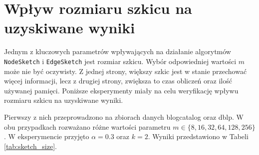 \section{Wpływ rozmiaru szkicu na uzyskiwane wyniki}
    Jednym z kluczowych parametrów wpływających na działanie algorytmów \texttt{NodeSketch} i \texttt{EdgeSketch} jest rozmiar szkicu. Wybór odpowiedniej wartości $m$ może nie być oczywisty. Z jednej strony, większy szkic jest w stanie przechować więcej informacji, lecz z drugiej strony, zwiększa to czas obliczeń oraz ilość używanej pamięci. Poniższe eksperymenty miały na celu weryfikację wpływu rozmiaru szkicu na uzyskiwane wyniki.

    Pierwszy z nich przeprowadzono na zbiorach danych blogcatalog oraz dblp. W obu przypadkach rozważano różne wartości parametru $m \in \{8, 16, 32, 64, 128, 256\}$. W eksperymencie przyjęto $\alpha = 0.3$ oraz $k = 2$. Wyniki przedstawiono w Tabeli \ref{tab:sketch_size}.

